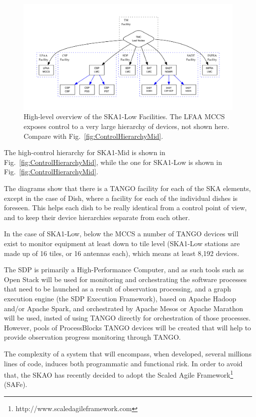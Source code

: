 \documentclass[a4paper,
               biblatex,       %
               keeplastbox,    %
               ]{jacow-2_1}    %
\begin{document}
\begin{figure}[!tb]
  \centering
    \includegraphics[width=.95\textwidth]{FRAPL01f9}
  \caption{High-level overview of the SKA1-Low Facilities. The LFAA MCCS exposes control to a very large hierarchy of devices, not shown here. Compare with Fig.~\ref{fig:ControlHierarchyMid}.}
  \label{fig:ControlHierarchyLow}
\end{figure}

The high-control hierarchy for SKA1-Mid is shown in Fig.~\ref{fig:ControlHierarchyMid}, while the one for SKA1-Low is shown in Fig.~\ref{fig:ControlHierarchyMid}.

The diagrams show that there is a TANGO facility for each of the SKA elements, except in the case of Dish, where a facility for each of the individual dishes is foreseen. This helps each dish to be really identical from a control point of view, and to keep their device hierarchies separate from each other.

In the case of SKA1-Low, below the MCCS a number of TANGO devices will exist to monitor equipment at least down to tile level (SKA1-Low stations are made up of 16 tiles, or 16 antennas each), which means at least 8,192 devices.

The SDP is primarily a High-Performance Computer, and as such tools such as Open Stack will be used for monitoring and orchestrating the software processes that need to be launched as a result of observation processing, and a graph execution engine (the SDP Execution Framework), based on Apache Hadoop and/or Apache Spark, and orchestrated by Apache Mesos or Apache Marathon will be used, insted of using TANGO directly for orchestration of those processes. However, pools of ProcessBlocks TANGO devices will be created that will help to provide observation progress monitoring through TANGO.

The complexity of a system that will encompass, when developed, several millions lines of code, induces both programmatic and functional risk. In order to avoid that, the SKAO has recently decided to adopt the Scaled Agile Framework\footnote{http://www.scaledagileframework.com} (SAFe).
\end{document}
